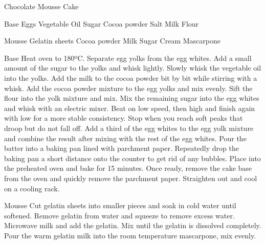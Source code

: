\documentclass[10pt, a4paper]{article}
\begin{document}
	\begin{recipe}{Chocolate Mousse Cake}
		\begin{ingredients}[2]
			\begin{ingredientgroup}{Base}
				 Eggs
				 Vegetable Oil
				 Sugar
				 Cocoa powder
				 Salt
				 Milk
				 Flour
			\end{ingredientgroup}
			\begin{ingredientgroup}{Mousse}
				 Gelatin sheets
				 Cocoa powder
				\ing{125g} Milk
				\ing{70g} Sugar
				\ing{175g} Cream
				 Mascarpone
			\end{ingredientgroup}
		\end{ingredients}
		\begin{procedure}
			\begin{proceduregroup}{Base}
				\step Heat oven to 180ºC.
				\step Separate egg yolks from the egg whites.
				\step Add a small amount of the sugar to the yolks and whisk lightly.
				\step Slowly whisk the vegetable oil into the yolks.
				\step Add the milk to the cocoa powder bit by bit while stirring with a whisk.
				\step Add the cocoa powder mixture to the egg yolks and mix evenly.
				\step Sift the flour into the yolk mixture and mix.
				\step Mix the remaining sugar into the egg whites and whisk with an electric mixer. Beat on low speed, then high and finish again with low for a more stable consistency. Stop when you reach soft peaks that droop but do not fall off.
				\step Add a third of the egg whites to the egg yolk mixture and combine the result after mixing with the rest of the egg whites.
				\step Pour the batter into a baking pan lined with parchment paper. Repeatedly drop the baking pan a short distance onto the counter to get rid of any bubbles.
				\step Place into the preheated oven and bake for 15 minutes.
				\step Once ready, remove the cake base from the oven and quickly remove the parchment paper. Straighten out and cool on a cooling rack.
			\end{proceduregroup}
			\begin{proceduregroup}{Mousse}
				\step Cut gelatin sheets into smaller pieces and soak in cold water until softened.
				\step Remove gelatin from water and squeeze to remove excess water.
				\step Microwave milk and add the gelatin. Mix until the gelatin is dissolved completely.
				\step Pour the warm gelatin milk into the room temperature mascarpone, mix evenly.

\end{proceduregroup}
\end{procedure}
\end{recipe}
\end{document}
